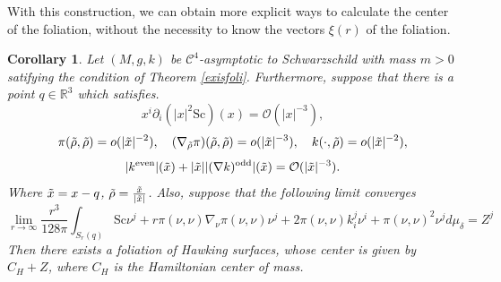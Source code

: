 \documentclass[12pt,a4paper]{amsart}
\theoremstyle{plain}
\newtheorem{corollary}[theorem]{Corollary}
\theoremstyle{definition}
\begin{document}
With this construction, we can obtain more explicit ways to calculate the center of the foliation, without the necessity to know the vectors $\xi(r)$ of the foliation.
\begin{corollary}
\label{corocenter1}     Let $(M,g,k)$ be $ \mathcal{C}^4$-asymptotic to Schwarzschild with mass $m>0$ satifying the condition of Theorem \ref{exisfoli}. Furthermore,  suppose that there is a point $q \in \mathbb{R}^3$ which satisfies. 
\begin{equation}\label{strongdec}
     x^i \partial_i (| x|^2 \mathrm{Sc})(x) = \mathcal{O}( | x|^{-3}),
\end{equation}
\begin{equation}\label{strongdecpi}
\pi (\Tilde{\rho}, \Tilde{\rho}) = o( | \Tilde{x}|^{-2}) , \quad (\nabla_{\Tilde{\rho}} \pi) (\Tilde{\rho}, \Tilde{\rho})= o(| \Tilde{x}|^{-3}) , \quad k(\cdot, \Tilde{\rho}) = o(| \Tilde{x}|^{-2}),
\end{equation}
\begin{equation}
    |k^{\text{even}}|(\Tilde{x}) + |\Tilde{x}||(\nabla k)^{\text{odd}}|(\Tilde{x}) = \mathcal{O}(|\Tilde{x}|^{-3}).
\end{equation}
Where $ \Tilde{x}= x-q$, $\Tilde{\rho}= \frac{\Tilde{x}}{|\Tilde{x}|}$. Also, suppose that the following limit converges  
\begin{equation}
    \lim_{r \to \infty}\frac{r^3}{128 \pi} \int_{S_r(q)} \mathrm{Sc} \nu^j + r \pi(\nu, \nu)   \nabla_{\nu}\pi(\nu,\nu) \nu^j +2  \pi(\nu, \nu)    k_i^j \nu^i 
   +    \pi(\nu, \nu)^2 \nu^j d\mu_{\delta} = Z^j
\end{equation}
Then there exists a foliation of Hawking surfaces, whose center is given by $C_H+Z$, where $C_H$ is the Hamiltonian center of mass.
\end{corollary}
\end{document}
